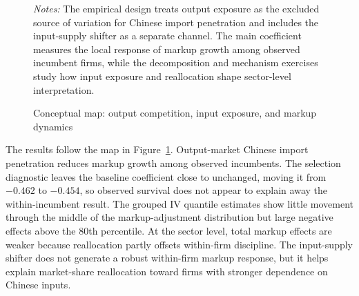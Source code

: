﻿\documentclass[12pt]{article}
\begin{document}
\begin{figure}[htbp]
\centering
{}
\caption{Conceptual map: output competition, input exposure, and markup dynamics}
\label{fig:conceptual_map}
\begin{minipage}{0.92\textwidth}
\footnotesize
\textit{Notes:} The empirical design treats output exposure as the excluded source of variation for Chinese import penetration and includes the input-supply shifter as a separate channel. The main coefficient measures the local response of markup growth among observed incumbent firms, while the decomposition and mechanism exercises study how input exposure and reallocation shape sector-level interpretation.
\end{minipage}
\end{figure}

The results follow the map in Figure~\ref{fig:conceptual_map}. Output-market Chinese import penetration reduces markup growth among observed incumbents. The selection diagnostic leaves the baseline coefficient close to unchanged, moving it from $-0.462$ to $-0.454$, so observed survival does not appear to explain away the within-incumbent result. The grouped IV quantile estimates show little movement through the middle of the markup-adjustment distribution but large negative effects above the 80th percentile. At the sector level, total markup effects are weaker because reallocation partly offsets within-firm discipline. The input-supply shifter does not generate a robust within-firm markup response, but it helps explain market-share reallocation toward firms with stronger dependence on Chinese inputs.
\end{document}
